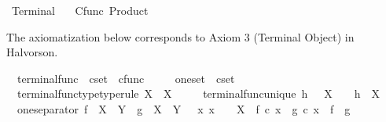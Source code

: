 %
\begin{isabellebody}%
%
%
\isadelimdocument
%
\endisadelimdocument
%
\isatagdocument
%
\isamarkuptrue%
%
\endisatagdocument
{\isafolddocument}%
%
\isadelimdocument
%
\endisadelimdocument
%
\isadelimtheory
%
\endisadelimtheory
%
\isatagtheory
{}\isamarkupfalse%
\ Terminal\isanewline
\ \ \ Cfunc\ Product\isanewline
{}%
\endisatagtheory
{\isafoldtheory}%
%
\isadelimtheory
%
\endisadelimtheory
%
\begin{isamarkuptext}%
The axiomatization below corresponds to Axiom 3 (Terminal Object) in Halvorson.%
\end{isamarkuptext}\isamarkuptrue%
\isamarkupfalse%
\isanewline
\ \ terminal{\isacharunderscore}{\kern0pt}func\ {\isacharcolon}{\kern0pt}{\isacharcolon}{\kern0pt}\ {\isachardoublequoteopen}cset\ {\isasymRightarrow}\ cfunc{\isachardoublequoteclose}\ {\isacharparenleft}{\kern0pt}{\isachardoublequoteopen}{\isasymbeta}\isactrlbsub {\isacharunderscore}{\kern0pt}\isactrlesub {\isachardoublequoteclose}\ {}{}{}{\isacharparenright}{\kern0pt}\ \isanewline
\ \ one{\isacharunderscore}{\kern0pt}set\ {\isacharcolon}{\kern0pt}{\isacharcolon}{\kern0pt}\ {\isachardoublequoteopen}cset{\isachardoublequoteclose}\ {\isacharparenleft}{\kern0pt}{\isachardoublequoteopen}{\isasymone}{\isachardoublequoteclose}{\isacharparenright}{\kern0pt}\isanewline
{}\isanewline
\ \ terminal{\isacharunderscore}{\kern0pt}func{\isacharunderscore}{\kern0pt}type{\isacharbrackleft}{\kern0pt}type{\isacharunderscore}{\kern0pt}rule{\isacharbrackright}{\kern0pt}{\isacharcolon}{\kern0pt}\ {\isachardoublequoteopen}{\isasymbeta}\isactrlbsub X\isactrlesub \ {\isacharcolon}{\kern0pt}\ X\ {\isasymrightarrow}\ {\isasymone}{\isachardoublequoteclose}\ \isanewline
\ \ terminal{\isacharunderscore}{\kern0pt}func{\isacharunderscore}{\kern0pt}unique{\isacharcolon}{\kern0pt}\ {\isachardoublequoteopen}h\ {\isacharcolon}{\kern0pt}\ \ X\ {\isasymrightarrow}\ {\isasymone}\ {\isasymLongrightarrow}\ h\ {\isacharequal}{\kern0pt}\ {\isasymbeta}\isactrlbsub X\isactrlesub {\isachardoublequoteclose}\ \isanewline
\ \ one{\isacharunderscore}{\kern0pt}separator{\isacharcolon}{\kern0pt}\ {\isachardoublequoteopen}f\ {\isacharcolon}{\kern0pt}\ X\ {\isasymrightarrow}\ Y\ {\isasymLongrightarrow}\ g\ {\isacharcolon}{\kern0pt}\ X\ {\isasymrightarrow}\ Y\ {\isasymLongrightarrow}\ {\isacharparenleft}{\kern0pt}{\isasymAnd}\ x{\isachardot}{\kern0pt}\ x\ {\isacharcolon}{\kern0pt}\ {\isasymone}\ {\isasymrightarrow}\ X\ {\isasymLongrightarrow}\ f\ {\isasymcirc}\isactrlsub c\ x\ {\isacharequal}{\kern0pt}\ g\ {\isasymcirc}\isactrlsub c\ x{\isacharparenright}{\kern0pt}\ {\isasymLongrightarrow}\ f\ {\isacharequal}{\kern0pt}\ g{\isachardoublequoteclose}\isanewline

\end{isabellebody}
